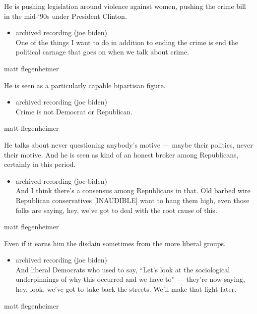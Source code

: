 He is pushing legislation around violence against women, pushing the
crime bill in the mid-`90s under President Clinton.

\begin{itemize}
\tightlist
\item
  archived recording (joe biden)\\
  One of the things I want to do in addition to ending the crime is end
  the political carnage that goes on when we talk about crime.
\end{itemize}

matt flegenheimer

He is seen as a particularly capable bipartisan figure.

\begin{itemize}
\tightlist
\item
  archived recording (joe biden)\\
  Crime is not Democrat or Republican.
\end{itemize}

matt flegenheimer

He talks about never questioning anybody's motive --- maybe their
politics, never their motive. And he is seen as kind of an honest broker
among Republicans, certainly in this period.

\begin{itemize}
\tightlist
\item
  archived recording (joe biden)\\
  And I think there's a consensus among Republicans in that. Old barbed
  wire Republican conservatives {[}INAUDIBLE{]} want to hang them high,
  even those folks are saying, hey, we've got to deal with the root
  cause of this.
\end{itemize}

matt flegenheimer

Even if it earns him the disdain sometimes from the more liberal groups.

\begin{itemize}
\tightlist
\item
  archived recording (joe biden)\\
  And liberal Democrats who used to say, ``Let's look at the
  sociological underpinnings of why this occurred and we have to'' ---
  they're now saying, hey, look, we've got to take back the streets.
  We'll make that fight later.
\end{itemize}

matt flegenheimer


